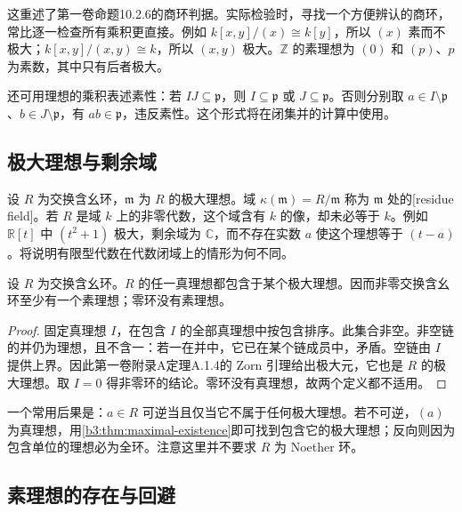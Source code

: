 这重述了第一卷命题10.2.6的商环判据。实际检验时，寻找一个方便辨认的商环，常比逐一检查所有乘积更直接。例如 \(k[x,y]/(x)\cong k[y]\)，所以 \((x)\) 素而不极大；\(k[x,y]/(x,y)\cong k\)，所以 \((x,y)\) 极大。\(\mathbb Z\) 的素理想为 \((0)\) 和 \((p)\)、\(p\) 为素数，其中只有后者极大。

\ProseParagraphBreak
还可用理想的乘积表述素性：若 \(I J\subseteq\mathfrak p\)，则 \(I\subseteq\mathfrak p\) 或 \(J\subseteq\mathfrak p\)。否则分别取 \(a\in I\setminus\mathfrak p\)、\(b\in J\setminus\mathfrak p\)，有 \(ab\in\mathfrak p\)，违反素性。这个形式将在闭集并的计算中使用。

\subsection{极大理想与剩余域}
\label{b3:subsec:0101:02}

设 \(R\) 为交换含幺环，\(\mathfrak m\) 为 \(R\) 的极大理想。域 \(\kappa(\mathfrak m)=R/\mathfrak m\) 称为 \(\mathfrak m\) 处的[residue field]。若 \(R\) 是域 \(k\) 上的非零代数，这个域含有 \(k\) 的像，却未必等于 \(k\)。例如 \(\mathbb R[t]\) 中 \((t^2+1)\) 极大，剩余域为 \(\mathbb C\)，而不存在实数 \(a\) 使这个理想等于 \((t-a)\)。将说明有限型代数在代数闭域上的情形为何不同。

\begin{theorem}\label{b3:thm:maximal-existence}
	设 \(R\) 为交换含幺环。\(R\) 的任一真理想都包含于某个极大理想。因而非零交换含幺环至少有一个素理想；零环没有素理想。
\end{theorem}
\begin{proof}
	固定真理想 \(I\)，在包含 \(I\) 的全部真理想中按包含排序。此集合非空。非空链的并仍为理想，且不含一：若一在并中，它已在某个链成员中，矛盾。空链由 \(I\) 提供上界。因此第一卷附录A定理A.1.4的 Zorn 引理给出极大元，它也是 \(R\) 的极大理想。取 \(I=0\) 得非零环的结论。零环没有真理想，故两个定义都不适用。
\end{proof}

一个常用后果是：\(a\in R\) 可逆当且仅当它不属于任何极大理想。若不可逆，\((a)\) 为真理想，用\cref{b3:thm:maximal-existence}即可找到包含它的极大理想；反向则因为包含单位的理想必为全环。注意这里并不要求 \(R\) 为 Noether 环。

\subsection{素理想的存在与回避}
\label{b3:subsec:0101:03}

